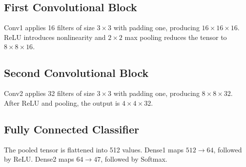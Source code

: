 \documentclass[a4paper,12pt]{extreport}
\begin{document}
\subsection*{First Convolutional Block}
Conv1 applies 16 filters of size $3\times3$ with padding one, producing $16\times16\times16$. ReLU introduces nonlinearity and $2\times2$ max pooling reduces the tensor to $8\times8\times16$.

\subsection*{Second Convolutional Block}
Conv2 applies 32 filters of size $3\times3$ with padding one, producing $8\times8\times32$. After ReLU and pooling, the output is $4\times4\times32$.

\subsection*{Fully Connected Classifier}
The pooled tensor is flattened into 512 values. Dense1 maps $512\rightarrow64$, followed by ReLU. Dense2 maps $64\rightarrow47$, followed by Softmax.

\begin{table}[H]
\centering
\caption{Current CNN architecture for $16\times16$ inputs.}
\label{tab:architecture}
\end{table}
\end{document}
